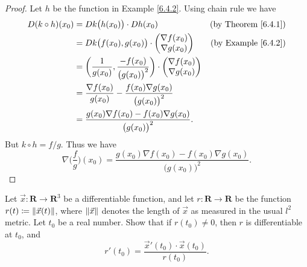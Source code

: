 \begin{proof}
    Let \(h\) be the function in Example \ref{6.4.2}.
    Using chain rule we have
    \begin{align*}
        D (k \circ h)(x_0) & = D k\big(h(x_0)\big) \cdot D h(x_0)                                                                & \text{(by Theorem \ref{6.4.1})} \\
                           & = D k\big(f(x_0), g(x_0)\big) \cdot \begin{pmatrix}
            \nabla f(x_0) \\
            \nabla g(x_0)
        \end{pmatrix}                                      & \text{(by Example \ref{6.4.2})} \\
                           & = \bigg(\frac{1}{g(x_0)}, \frac{-f(x_0)}{\big(g(x_0)\big)^2}\bigg) \cdot \begin{pmatrix}
            \nabla f(x_0) \\
            \nabla g(x_0)
        \end{pmatrix}                                   \\
                           & = \frac{\nabla f(x_0)}{g(x_0)} - \frac{f(x_0) \nabla g(x_0)}{\big(g(x_0)\big)^2}                                                      \\
                           & = \frac{g(x_0) \nabla f(x_0) - f(x_0) \nabla g(x_0)}{\big(g(x_0)\big)^2}.
    \end{align*}
    But \(k \circ h = f / g\).
    Thus we have
    \[
        \nabla \bigg(\frac{f}{g}\bigg)(x_0) = \frac{g(x_0) \nabla f(x_0) - f(x_0) \nabla g(x_0)}{\big(g(x_0)\big)^2}.
    \]
\end{proof}

\begin{exercise}\label{ex 6.4.5}
    Let \(\vec{x} : \mathbf{R} \to \mathbf{R}^3\) be a differentiable function, and let \(r : \mathbf{R} \to \mathbf{R}\) be the function \(r(t) \coloneqq \norm*{\vec{x}(t)}\), where \(\norm*{\vec{x}}\) denotes the length of \(\vec{x}\) as measured in the usual \(l^2\) metric.
    Let \(t_0\) be a real number.
    Show that if \(r(t_0) \neq 0\), then \(r\) is differentiable at \(t_0\), and
    \[
        r'(t_0) = \frac{\vec{x}'(t_0) \cdot \vec{x}(t_0)}{r(t_0)}.
    \]
\end{exercise}

